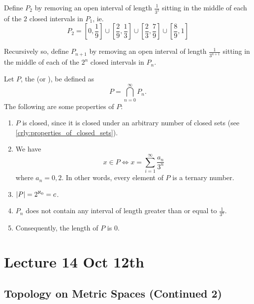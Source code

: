 \documentclass[notoc,notitlepage]{tufte-book}
\begin{document}
\begin{eg}
  Define $P_2$ by removing an open interval of length $\frac{1}{3^2}$ sitting in the middle of each of the $2$ closed intervals in $P_1$, ie.
  \begin{equation*}
    P_2 = \left[0, \frac{1}{9}\right] \cup \left[ \frac{2}{9}, \frac{1}{3} \right] \cup \left[ \frac{2}{3}, \frac{7}{9} \right] \cup \left[ \frac{8}{9}, 1 \right]
  \end{equation*}

  Recursively so, define $P_{n + 1}$ by removing an open interval of length $\frac{1}{3^{n + 1}}$ sitting in the middle of each of the $2^n$ closed intervals in $P_n$.

  Let $P$, the  (or ), be defined as
  \begin{equation*}
    P = \bigcap_{n = 0}^{\infty} P_n.
  \end{equation*}
  The following are some properties of $P$:
  \begin{enumerate}
    \item $P$ is closed, since it is closed under an arbitrary number of closed sets (see \cref{crly:properties_of_closed_sets}).
    \item We have
      \begin{equation*}
        x \in P \iff x = \sum_{i=1}^{\infty} \frac{a_n}{3^n}
      \end{equation*}
      where $a_n = 0, 2$. In other words, every element of $P$ is a ternary number.
    \item $\left|P\right| = 2^{\aleph_0} = c$.
    \item $P_n$ does not contain any interval of length greater than or equal to $\frac{1}{3^n}$.
    \item Consequently, the length of $P$ is $0$.
  \end{enumerate}
\end{eg}



\chapter{Lecture 14 Oct 12th}%
\label{chp:lecture_14_oct_12th}

\section{Topology on Metric Spaces (Continued 2)}%
\label{sec:topology_on_metric_spaces_continued_2}
\end{document}
